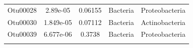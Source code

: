\documentclass[]{article}
\begin{document}
\begin{longtable}[]{@{}ccccc@{}}
\begin{minipage}[t]{0.13\columnwidth}\centering\strut
Otu00028\strut
\end{minipage} & \begin{minipage}[t]{0.14\columnwidth}\centering\strut
2.89e-05\strut
\end{minipage} & \begin{minipage}[t]{0.12\columnwidth}\centering\strut
0.06155\strut
\end{minipage} & \begin{minipage}[t]{0.13\columnwidth}\centering\strut
Bacteria\strut
\end{minipage} & \begin{minipage}[t]{0.20\columnwidth}\centering\strut
Proteobacteria\strut
\end{minipage}\tabularnewline
\begin{minipage}[t]{0.13\columnwidth}\centering\strut
Otu00030\strut
\end{minipage} & \begin{minipage}[t]{0.14\columnwidth}\centering\strut
1.849e-05\strut
\end{minipage} & \begin{minipage}[t]{0.12\columnwidth}\centering\strut
0.07112\strut
\end{minipage} & \begin{minipage}[t]{0.13\columnwidth}\centering\strut
Bacteria\strut
\end{minipage} & \begin{minipage}[t]{0.20\columnwidth}\centering\strut
Actinobacteria\strut
\end{minipage}\tabularnewline
\begin{minipage}[t]{0.13\columnwidth}\centering\strut
Otu00039\strut
\end{minipage} & \begin{minipage}[t]{0.14\columnwidth}\centering\strut
6.677e-06\strut
\end{minipage} & \begin{minipage}[t]{0.12\columnwidth}\centering\strut
0.3738\strut
\end{minipage} & \begin{minipage}[t]{0.13\columnwidth}\centering\strut
Bacteria\strut
\end{minipage} & \begin{minipage}[t]{0.20\columnwidth}\centering\strut
Proteobacteria\strut
\end{minipage}\tabularnewline
\begin{minipage}[t]{0.13\columnwidth}\centering\strut

\end{minipage}
\end{longtable}
\end{document}
